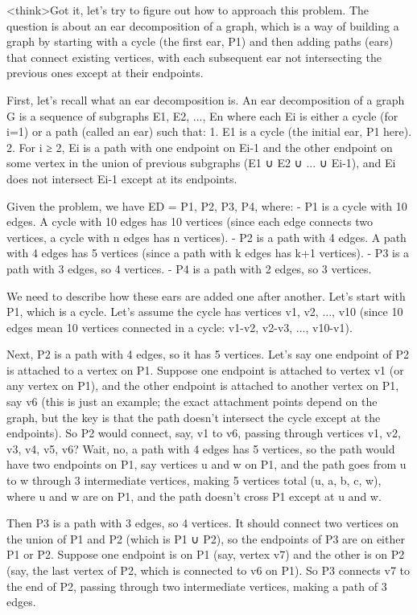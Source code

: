 <think>Got it, let's try to figure out how to approach this problem. The question is about an ear decomposition of a graph, which is a way of building a graph by starting with a cycle (the first ear, P1) and then adding paths (ears) that connect existing vertices, with each subsequent ear not intersecting the previous ones except at their endpoints. 

First, let's recall what an ear decomposition is. An ear decomposition of a graph G is a sequence of subgraphs E1, E2, ..., En where each Ei is either a cycle (for i=1) or a path (called an ear) such that:
1. E1 is a cycle (the initial ear, P1 here).
2. For i ≥ 2, Ei is a path with one endpoint on Ei-1 and the other endpoint on some vertex in the union of previous subgraphs (E1 ∪ E2 ∪ ... ∪ Ei-1), and Ei does not intersect Ei-1 except at its endpoints.

Given the problem, we have ED = {P1, P2, P3, P4}, where:
- P1 is a cycle with 10 edges. A cycle with 10 edges has 10 vertices (since each edge connects two vertices, a cycle with n edges has n vertices).
- P2 is a path with 4 edges. A path with 4 edges has 5 vertices (since a path with k edges has k+1 vertices).
- P3 is a path with 3 edges, so 4 vertices.
- P4 is a path with 2 edges, so 3 vertices.

We need to describe how these ears are added one after another. Let's start with P1, which is a cycle. Let's assume the cycle has vertices v1, v2, ..., v10 (since 10 edges mean 10 vertices connected in a cycle: v1-v2, v2-v3, ..., v10-v1).

Next, P2 is a path with 4 edges, so it has 5 vertices. Let's say one endpoint of P2 is attached to a vertex on P1. Suppose one endpoint is attached to vertex v1 (or any vertex on P1), and the other endpoint is attached to another vertex on P1, say v6 (this is just an example; the exact attachment points depend on the graph, but the key is that the path doesn't intersect the cycle except at the endpoints). So P2 would connect, say, v1 to v6, passing through vertices v1, v2, v3, v4, v5, v6? Wait, no, a path with 4 edges has 5 vertices, so the path would have two endpoints on P1, say vertices u and w on P1, and the path goes from u to w through 3 intermediate vertices, making 5 vertices total (u, a, b, c, w), where u and w are on P1, and the path doesn't cross P1 except at u and w.

Then P3 is a path with 3 edges, so 4 vertices. It should connect two vertices on the union of P1 and P2 (which is P1 ∪ P2), so the endpoints of P3 are on either P1 or P2. Suppose one endpoint is on P1 (say, vertex v7) and the other is on P2 (say, the last vertex of P2, which is connected to v6 on P1). So P3 connects v7 to the end of P2, passing through two intermediate vertices, making a path of 3 edges.

